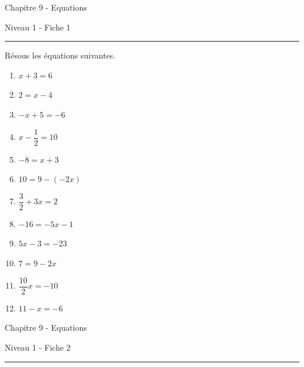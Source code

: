 \documentclass[12pt,parskip=half-, twoside=semi]{scrartcl}
\begin{document}

\begin{center}
  \bfseries
  \begin{Huge}
    Chapitre 9 - Equations
  \end{Huge}
  \smallbreak
  \begin{large}
    Niveau 1  - Fiche 1
  \end{large}
  \smallbreak
  \rule[10pt]{.5\linewidth}{1 pt}
\end{center}
\setcounter{exercise}{0}

\begin{exercise}
  Résous les équations suivantes.
  \begin{enumerate}[itemsep=0.4cm]
    \item \(x + 3 = 6\)
    \item \(2=x-4\)
    \item \(-x + 5 = -6\)
    \item \(x - \dfrac{1}{2} = 10\)
    \item \(-8=x + 3\)
    \item \(10=9-(-2x)\)
    \item \(\dfrac{3}{2}+3x=2\)
    \item \(-16=-5x-1\)
    \item \(5x-3=-23\)
    \item \(7=9-2x\)
    \item \(\dfrac{10}{2} x  = -10\)
    \item \(11- x = -6\)
\end{enumerate}
\end{exercise}

\newpage

\begin{center}
    \bfseries
    \begin{Huge}
      Chapitre 9 - Equations
    \end{Huge}
    \smallbreak
    \begin{large}
      Niveau 1  - Fiche 2
    \end{large}
    \smallbreak
    \rule[10pt]{.5\linewidth}{1 pt}
  \end{center}
  \setcounter{exercise}{0}
\end{document}
